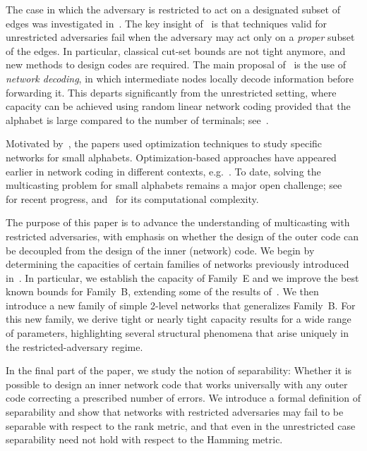 \documentclass[11pt,a4paper]{article}
\theoremstyle{definition}
\begin{document}
The case in which the adversary is restricted to act on a designated subset of edges was investigated in~\cite{ravagnani2018adversarial,beemer2023network}. The key insight of~\cite{beemer2023network} is that techniques valid for unrestricted adversaries fail when the adversary may act only on a \textit{proper} subset of the edges. In particular, classical cut-set bounds are not tight anymore, and new methods to design codes are required. 
The main proposal of~\cite{beemer2023network} 
is the use of \textit{network decoding}, in which intermediate nodes locally decode information before forwarding it. This departs significantly from the unrestricted setting, where capacity can be achieved using random linear network coding provided that the alphabet is large compared to the number of terminals; see~\cite{li2003linear,koetter2003algebraic,jaggi2007resilient,ho2006random,koetter2008coding,jaggi2005polynomial}.


Motivated by~\cite{beemer2023network}, the papers \cite{kurz2022capacity,hojny2023role} used optimization techniques to study specific networks for small alphabets. Optimization-based approaches have appeared earlier in network coding in different contexts, e.g.~\cite{lun2005achieving,lun2006minimum}. To date, solving the multicasting problem for small alphabets remains a major open challenge; see~\cite{chekuri2006average,guang2018alphabet,sun2016base} for recent progress, and~\cite{lehman2004complexity} for its computational complexity.



The purpose of this paper is to advance the understanding of multicasting with restricted adversaries, with emphasis on whether the design of the outer code can be decoupled from the design of the inner (network) code. We begin by determining the capacities of certain families of networks previously introduced in~\cite{beemer2023network}. In particular, we establish the capacity of Family~E and we improve the best known bounds for Family~B, extending some of the results of~\cite{kurz2022capacity}. We then introduce a new family of simple 2-level networks that generalizes Family~B. For this new family, we derive tight or nearly tight capacity results for a wide range of parameters, highlighting several structural phenomena that arise uniquely in the restricted-adversary regime.


In the final part of the paper, we study the notion of separability: Whether it is possible to design an inner network code that works universally with any outer code correcting a prescribed number of errors. We introduce a formal definition of separability and show that networks with restricted adversaries may fail to be separable with respect to the rank metric, and that even in the unrestricted case separability need not hold with respect to the Hamming metric.
\end{document}
